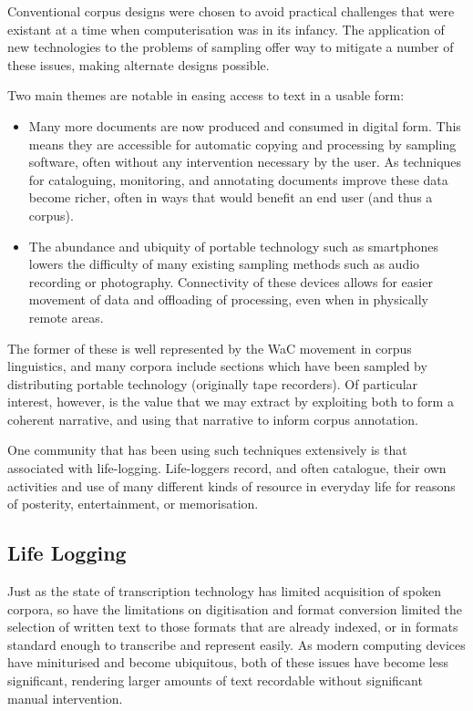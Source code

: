 Conventional corpus designs were chosen to avoid practical challenges that were existant at a time when computerisation was in its infancy.  The application of new technologies to the problems of sampling offer way to mitigate a number of these issues, making alternate designs possible.

Two main themes are notable in easing access to text in a usable form:

\begin{itemize}
    \item Many more documents are now produced and consumed in digital form.  This means they are accessible for automatic copying and processing by sampling software, often without any intervention necessary by the user.  As techniques for cataloguing, monitoring, and annotating documents improve these data become richer, often in ways that would benefit an end user (and thus a corpus).
    \item The abundance and ubiquity of portable technology such as smartphones lowers the difficulty of many existing sampling methods such as audio recording or photography.  Connectivity of these devices allows for easier movement of data and offloading of processing, even when in physically remote areas.
\end{itemize}


The former of these is well represented by the WaC movement in corpus linguistics, and many corpora include sections which have been sampled by distributing portable technology (originally tape recorders).  Of particular interest, however, is the value that we may extract by exploiting both to form a coherent narrative, and using that narrative to inform corpus annotation.

One community that has been using such techniques extensively is that associated with life-logging.  Life-loggers record, and often catalogue, their own activities and use of many different kinds of resource in everyday life for reasons of posterity, entertainment, or memorisation.










\subsection{Life Logging}
Just as the state of transcription technology has limited acquisition of spoken corpora, so have the limitations on digitisation and format conversion limited the selection of written text to those formats that are already indexed, or in formats standard enough to transcribe and represent easily.   As modern computing devices have miniturised and become ubiquitous, both of these issues have become less significant, rendering larger amounts of text recordable without significant manual intervention.

